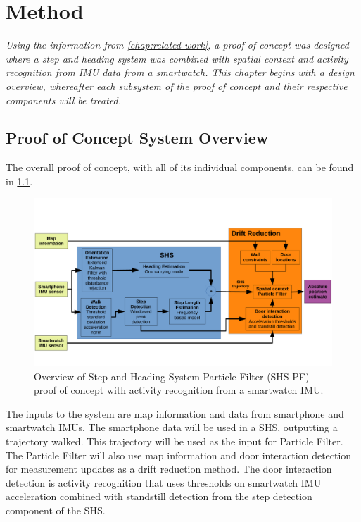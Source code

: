 \chapter{Method}
\label{chap:method}
\textit{Using the information from \cref{chap:related work}, a proof of concept was designed where a step and heading system was combined with spatial context and activity recognition from IMU data from a smartwatch. This chapter begins with a design overview, whereafter each subsystem of the proof of concept and their respective components will be treated.}

\section{Proof of Concept System Overview}
The overall proof of concept, with all of its individual components, can be found in \cref{fig:system_design}. 
\begin{figure}[H]
	\centering
	\includegraphics[trim=0 40 0 50, clip, width=1.1\linewidth]{images/system_design}
	\setlength{\abovecaptionskip}{3pt}

	\caption{Overview of Step and Heading System-Particle Filter (SHS-PF) proof of concept  with activity recognition from a smartwatch IMU.}
	\label{fig:system_design}
\end{figure}
The inputs to the system are map information and data from smartphone and smartwatch IMUs. The smartphone data will be used in a \ac{SHS}, outputting a trajectory walked. This trajectory will be used as the input for Particle Filter. The Particle Filter will also use map information and door interaction detection for measurement updates as a drift reduction method. The door interaction detection is activity recognition that uses thresholds on smartwatch IMU acceleration combined with standstill detection from the step detection component of the \ac{SHS}. 

